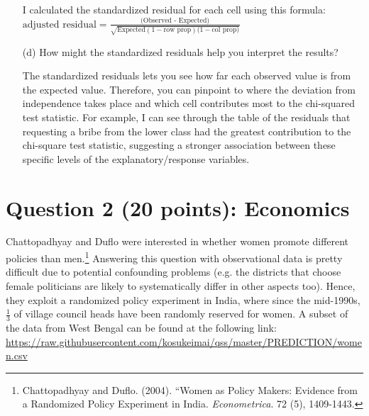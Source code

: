 \documentclass[12pt,letterpaper]{article}
\begin{document}
\begin{enumerate}
\begin{table}[h]
\begin{tabular}{l | c c c }
		\end{tabular}
	\end{table}
	
	I calculated the standardized residual for each cell using this formula: $\text{adjusted residual} = \frac{\text{(Observed - Expected)}}{\sqrt{\text{Expected}(1 - \text{row prop})(1 - \text{col prop)}}}$
	
 

	\item [(d)] How might the standardized residuals help you interpret the results?  
	
			The standardized residuals lets you see how far each observed value is from the expected value. Therefore, you can pinpoint to where the deviation from independence takes place and which cell contributes most to the chi-squared test statistic. For example, I can see through the table of the residuals that requesting a bribe from the lower class had the greatest contribution to the chi-square test statistic, suggesting a stronger association between these specific levels of the explanatory/response variables.
\end{enumerate}
\newpage

\section*{Question 2 (20 points): Economics}
Chattopadhyay and Duflo were interested in whether women promote different policies than men.\footnote{Chattopadhyay and Duflo. (2004). ``Women as Policy Makers: Evidence from a Randomized Policy Experiment in India. \textit{Econometrica}. 72 (5), 1409-1443.} Answering this question with observational data is pretty difficult due to potential confounding problems (e.g. the districts that choose female politicians are likely to systematically differ in other aspects too). Hence, they exploit a randomized policy experiment in India, where since the mid-1990s, $\frac{1}{3}$ of village council heads have been randomly reserved for women. A subset of the data from West Bengal can be found at the following link: \url{https://raw.githubusercontent.com/kosukeimai/qss/master/PREDICTION/women.csv}\\
\end{document}
